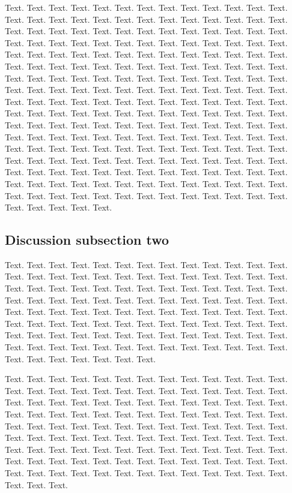 \documentclass[a4,center,fleqn]{NAR}
\begin{document}
Text. Text. Text. Text. Text. Text. Text. Text. Text. Text. Text.
Text. Text. Text. Text. Text. Text. Text. Text. Text. Text. Text.
Text. Text. Text. Text. Text. Text. Text. Text. Text. Text. Text.
Text. Text. Text. Text. Text. Text. Text. Text. Text. Text. Text.
Text. Text. Text. Text. Text. Text. Text. Text. Text. Text. Text.
Text. Text. Text. Text. Text. Text. Text. Text. Text. Text. Text.
Text. Text. Text. Text. Text. Text. Text. Text. Text. Text. Text.
Text. Text. Text. Text. Text. Text. Text. Text. Text. Text. Text.
Text. Text. Text. Text. Text. Text. Text. Text. Text. Text. Text.
Text. Text. Text. Text. Text. Text. Text. Text. Text. Text. Text.
Text. Text. Text. Text. Text. Text. Text. Text. Text. Text. Text.
Text. Text. Text. Text. Text. Text. Text. Text. Text. Text. Text.
Text. Text. Text. Text. Text. Text. Text. Text. Text. Text. Text.
Text. Text. Text. Text. Text. Text. Text. Text. Text. Text. Text.
Text. Text. Text. Text. Text. Text. Text. Text. Text. Text. Text.
Text. Text. Text. Text. Text. Text. Text. Text. Text. Text. Text.
Text. Text. Text. Text. Text. Text. Text. Text. Text. Text. Text.
Text. Text. Text. Text. Text. Text. Text. Text. Text. Text. Text.
Text. Text. Text. Text. Text. Text. Text. Text. Text. Text. Text.
Text. Text. Text. Text. Text. Text. Text. Text. Text. Text. Text.
Text. Text. Text. Text. Text. Text.


\subsection{Discussion subsection two}

Text. Text. Text. Text. Text. Text. Text. Text. Text. Text. Text.
Text. Text. Text. Text. Text. Text. Text. Text. Text. Text. Text.
Text. Text. Text. Text. Text. Text. Text. Text. Text. Text. Text.
Text. Text. Text. Text. Text. Text. Text. Text. Text. Text. Text.
Text. Text. Text. Text. Text. Text. Text. Text. Text. Text. Text.
Text. Text. Text. Text. Text. Text. Text. Text. Text. Text. Text.
Text. Text. Text. Text. Text. Text. Text. Text. Text. Text. Text.
Text. Text. Text. Text. Text. Text. Text. Text. Text. Text. Text.
Text. Text. Text. Text. Text. Text. Text. Text. Text. Text. Text.
Text. Text. Text. Text. Text. Text. Text. Text. Text. Text. Text.
Text.

Text. Text. Text. Text. Text. Text. Text. Text. Text. Text. Text.
Text. Text. Text. Text. Text. Text. Text. Text. Text. Text. Text.
Text. Text. Text. Text. Text. Text. Text. Text. Text. Text. Text.
Text. Text. Text. Text. Text. Text. Text. Text. Text. Text. Text.
Text. Text. Text. Text. Text. Text. Text. Text. Text. Text. Text.
Text. Text. Text. Text. Text. Text. Text. Text. Text. Text. Text.
Text. Text. Text. Text. Text. Text. Text. Text. Text. Text. Text.
Text. Text. Text. Text. Text. Text. Text. Text. Text. Text. Text.
Text. Text. Text. Text. Text. Text. Text. Text. Text. Text. Text.
Text. Text. Text. Text. Text. Text. Text. Text. Text. Text. Text.
Text. Text. Text. Text. Text. Text. Text. Text. Text. Text.
\end{document}
